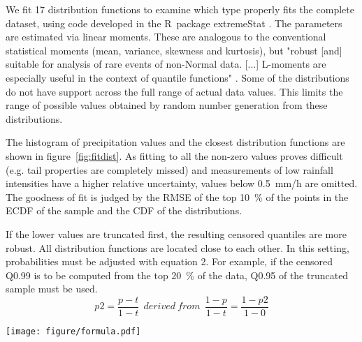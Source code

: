 \documentclass[a4paper]{article}
\begin{document}
\begin{multicols}{2}
We fit 17 distribution functions to examine which type properly fits the complete dataset, using code developed in the R~package extremeStat \citep{boessenkool_extremestat_2015}.
The parameters are estimated via linear moments. 
These are analogous to the conventional statistical moments (mean, variance, skewness and kurtosis), but "robust [and] suitable for analysis of rare events of non-Normal data. 
[...]
L-moments are especially useful in the context of quantile functions" \citep{asquith_lmomco:_2015}.
Some of the distributions do not have support across the full range of actual data values. 
This limits the range of possible values obtained by random number generation from these distributions.

The histogram of precipitation values and the closest distribution functions are shown in figure~\ref{fig:fitdist}.
As fitting to all the non-zero values proves difficult (e.g. tail properties are completely missed) and measurements of low rainfall intensities have a higher relative uncertainty, values below 0.5~mm/h are omitted. 
The goodness of fit is judged by the RMSE of the top 10~\% of the points in the ECDF of the sample \citep{r_core_team_r:_2015} and the CDF of the distributions.

If the lower values are truncated first, the resulting censored quantiles are more robust.
All distribution functions are located close to each other.
In this setting, probabilities must be adjusted with equation 2.
For example, if the censored Q0.99 is to be computed from the top 20~\% of the data, Q0.95 of the truncated sample must be used.
\begin{equation}
p2  =  \frac{p-t}{1-t}~~derived~from~~\frac{1-p}{1-t}  =  \frac{1-p2}{1-0} 
\end{equation}

\texttt{[image: figure/formula.pdf]}


\end{multicols}
\end{document}
